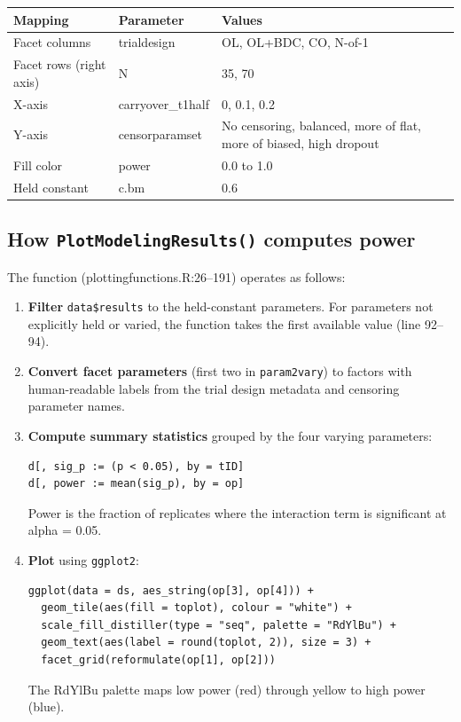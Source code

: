 \documentclass[11pt]{article}
\begin{document}
\begin{table}[h]
\centering
\begin{tabular}{lll}
\toprule
Mapping & Parameter & Values \\
\midrule
Facet columns & trialdesign & OL, OL+BDC, CO, N-of-1 \\
Facet rows (right axis) & N & 35, 70 \\
X-axis & carryover\_t1half & 0, 0.1, 0.2 \\
Y-axis & censorparamset & No censoring, balanced, more of flat, more of biased, high dropout \\
Fill color & power & 0.0 to 1.0 \\
Held constant & c.bm & 0.6 \\
\bottomrule
\end{tabular}
\end{table}

\subsection{How \texttt{PlotModelingResults()} computes power}

The function (plottingfunctions.R:26--191) operates as follows:

\begin{enumerate}
  \item \textbf{Filter} \texttt{data\$results} to the held-constant parameters.
    For parameters not explicitly held or varied, the function
    takes the first available value (line 92--94).
  \item \textbf{Convert facet parameters} (first two in \texttt{param2vary}) to
    factors with human-readable labels from the trial design
    metadata and censoring parameter names.
  \item \textbf{Compute summary statistics} grouped by the four varying
    parameters:

    \begin{lstlisting}
d[, sig_p := (p < 0.05), by = tID]
d[, power := mean(sig_p), by = op]
    \end{lstlisting}

    Power is the fraction of replicates where the interaction
    term is significant at alpha = 0.05.

  \item \textbf{Plot} using \texttt{ggplot2}:

    \begin{lstlisting}
ggplot(data = ds, aes_string(op[3], op[4])) +
  geom_tile(aes(fill = toplot), colour = "white") +
  scale_fill_distiller(type = "seq", palette = "RdYlBu") +
  geom_text(aes(label = round(toplot, 2)), size = 3) +
  facet_grid(reformulate(op[1], op[2]))
    \end{lstlisting}

    The RdYlBu palette maps low power (red) through yellow to
    high power (blue).
\end{enumerate}
\end{document}
